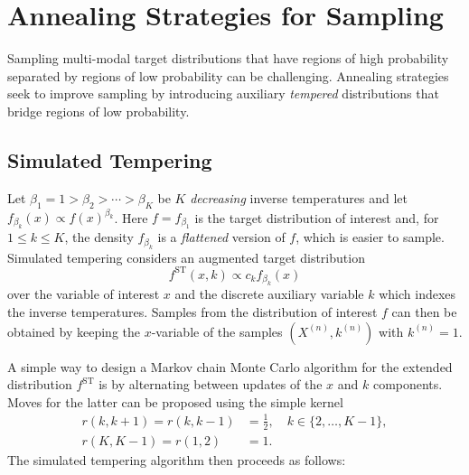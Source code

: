 
\section{Annealing Strategies for Sampling}
\label{sec:7.2}

Sampling multi-modal target distributions that have regions of high probability separated by
regions of low probability can be challenging. Annealing strategies seek to improve sampling by
introducing auxiliary \textit{tempered} distributions that bridge regions of low probability.

\subsection{Simulated Tempering}
\label{sec:7.2.1}

Let $\beta_1 = 1 > \beta_2 > \cdots > \beta_K$ be $K$ \textit{decreasing} inverse temperatures
and let $f_{\beta_k}(x) \propto f(x)^{\beta_k}$. Here $f = f_{\beta_1}$ is the target
distribution of interest and, for $1 \leq k \leq K$, the density $f_{\beta_k}$ is a
\textit{flattened} version of $f$, which is easier to sample. Simulated tempering considers an
augmented target distribution
\[
  f^{\mathrm{ST}}(x, k) \propto c_k f_{\beta_k}(x)
\]
over the variable of interest $x$ and the discrete auxiliary variable $k$ which indexes the
inverse temperatures. Samples from the distribution of interest $f$ can then be obtained by
keeping the $x$-variable of the samples $(X^{(n)}, k^{(n)})$ with $k^{(n)} = 1$.

A simple way to design a Markov chain Monte Carlo algorithm for the extended distribution
$f^{\mathrm{ST}}$ is by alternating between updates of the $x$ and $k$ components. Moves for
the latter can be proposed using the simple kernel
\begin{align*}
  r(k, k+1) = r(k, k-1) &= \tfrac{1}{2}, \quad k \in \{2, \ldots, K-1\},\\
  r(K, K-1) = r(1, 2)   &= 1.
\end{align*}
The simulated tempering algorithm then proceeds as follows:

